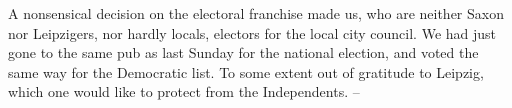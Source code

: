 
A nonsensical decision on the electoral franchise made us, who are neither Saxon nor Leipzigers, nor hardly locals, electors for the local city council. We had just gone to the same pub as last Sunday for the national election, and voted the same way for the Democratic list. To some extent out of gratitude to Leipzig, which one would like to protect from the Independents. -- \missing
